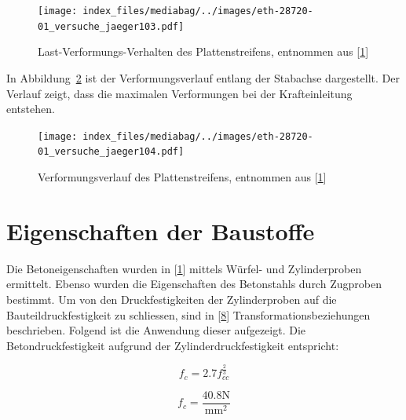 \documentclass[
  12pt,
  letterpaper,
  egregdoesnotlikesansseriftitles]{scrreprt}
\begin{document}
\begin{figure}[H]

{\centering \texttt{[image: index\_files/mediabag/../images/eth-28720-01\_versuche\_jaeger103.pdf]}

}

\caption{\label{fig-lastverformung_a3v2}Last-Verformungs-Verhalten des
Plattenstreifens, entnommen aus
{[}\protect\hyperlink{ref-Jaeger2006}{1}{]}}

\end{figure}

In Abbildung~\ref{fig-verformungsverlauf_a3v2} ist der
Verformungsverlauf entlang der Stabachse dargestellt. Der Verlauf zeigt,
dass die maximalen Verformungen bei der Krafteinleitung entstehen.

\begin{figure}[H]

{\centering \texttt{[image: index\_files/mediabag/../images/eth-28720-01\_versuche\_jaeger104.pdf]}

}

\caption{\label{fig-verformungsverlauf_a3v2}Verformungsverlauf des
Plattenstreifens, entnommen aus
{[}\protect\hyperlink{ref-Jaeger2006}{1}{]}}

\end{figure}

\hypertarget{eigenschaften-der-baustoffe}{%
\section{Eigenschaften der
Baustoffe}\label{eigenschaften-der-baustoffe}}

Die Betoneigenschaften wurden in
{[}\protect\hyperlink{ref-Jaeger2006}{1}{]} mittels Würfel- und
Zylinderproben ermittelt. Ebenso wurden die Eigenschaften des
Betonstahls durch Zugproben bestimmt. Um von den Druckfestigkeiten der
Zylinderproben auf die Bauteildruckfestigkeit zu schliessen, sind in
{[}\protect\hyperlink{ref-Jaeger2014}{8}{]} Transformationsbeziehungen
beschrieben. Folgend ist die Anwendung dieser aufgezeigt. Die
Betondruckfestigkeit aufgrund der Zylinderdruckfestigkeit entspricht:

\begin{equation}f_{c} = 2.7 f_{cc}^{\frac{2}{3}}\end{equation}

\begin{equation}f_{c} = \frac{40.8 \text{N}}{\text{mm}^{2}}\end{equation}
\end{document}
